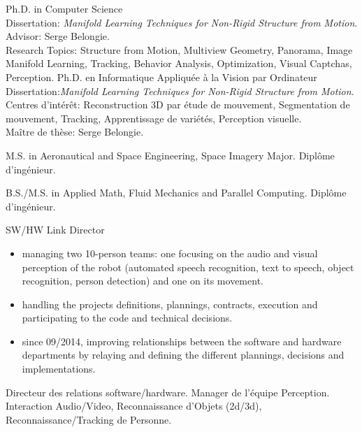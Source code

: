 \documentclass{article}
\begin{document}


\begin{llist}

 
{
Ph.D. in Computer Science\\
Dissertation: \textit{Manifold Learning Techniques for Non-Rigid Structure from
Motion}.\\
Advisor: Serge Belongie.\\
Research Topics: Structure from Motion, Multiview Geometry, Panorama, Image Manifold Learning, Tracking, Behavior 
Analysis, Optimization, Visual Captchas, Perception.
}
{
Ph.D. en Informatique Appliqu\'{e}e \`{a} la Vision par Ordinateur\\
Dissertation:\textit{Manifold Learning Techniques for Non-Rigid Structure from
Motion}.\\
Centres d'int\'{e}r\^{e}t: Reconstruction 3D par \'{e}tude de mouvement, Segmentation de mouvement, Tracking, 
Apprentissage de vari\'{e}t\'{e}s, Perception visuelle.\\
Ma\^{i}tre de th\`{e}se: Serge Belongie.
}

 
{
M.S. in Aeronautical and Space Engineering, Space Imagery Major.
}
{
Dipl\^{o}me d'ing\'{e}nieur.
}

 
{
B.S./M.S. in Applied Math, Fluid Mechanics and Parallel Computing.
}
{
Dipl\^{o}me d'ing\'{e}nieur.
}

{
}
{
}
\vspace{-0.33cm}

{
SW/HW Link Director
\vspace{-0.33cm}
\begin{itemize}
 \item managing two 10-person teams: one focusing on the audio and visual perception of the robot (automated speech 
recognition, text to speech, object recognition, person detection) and one on its movement.
 \item handling the projects definitions, plannings, contracts, execution and participating to the code and technical 
decisions.
 \item since 09/2014, improving relationships between the software and hardware departments by relaying and defining 
the different plannings, decisions and implementations.
\end{itemize}
}
{
Directeur des relations software/hardware.
Manager de l'\'{e}quipe Perception. Interaction Audio/Video, Reconnaissance d'Objets (2d/3d), Reconnaissance/Tracking 
de 
Personne.
}


\end{llist}
\end{document}
